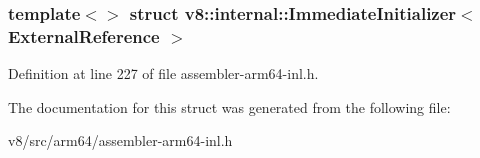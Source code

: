 \subsubsection*{template$<$$>$\newline
struct v8\+::internal\+::\+Immediate\+Initializer$<$ External\+Reference $>$}



Definition at line 227 of file assembler-\/arm64-\/inl.\+h.



The documentation for this struct was generated from the following file\+:\begin{DoxyCompactItemize}
\item 
v8/src/arm64/assembler-\/arm64-\/inl.\+h\end{DoxyCompactItemize}
